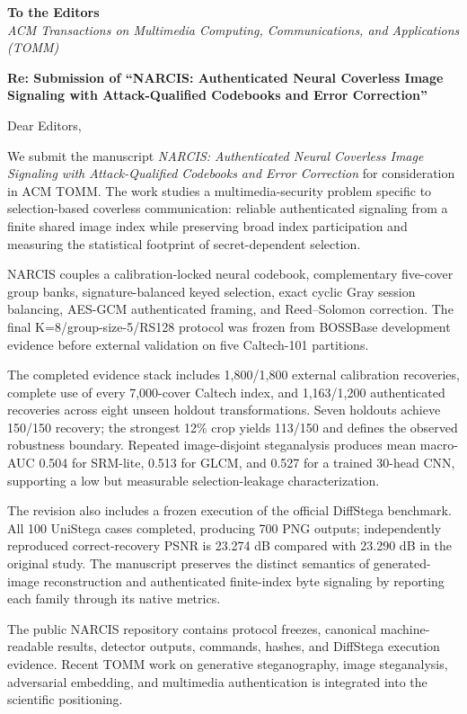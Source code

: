 \documentclass[11pt]{article}
\begin{document}
\thispagestyle{empty}

\textbf{To the Editors}\\
\textit{ACM Transactions on Multimedia Computing, Communications, and Applications (TOMM)}

\textbf{Re: Submission of ``NARCIS: Authenticated Neural Coverless Image Signaling with Attack-Qualified Codebooks and Error Correction''}

Dear Editors,

We submit the manuscript \emph{NARCIS: Authenticated Neural Coverless Image Signaling with Attack-Qualified Codebooks and Error Correction} for consideration in ACM TOMM. The work studies a multimedia-security problem specific to selection-based coverless communication: reliable authenticated signaling from a finite shared image index while preserving broad index participation and measuring the statistical footprint of secret-dependent selection.

NARCIS couples a calibration-locked neural codebook, complementary five-cover group banks, signature-balanced keyed selection, exact cyclic Gray session balancing, AES-GCM authenticated framing, and Reed--Solomon correction. The final K=8/group-size-5/RS128 protocol was frozen from BOSSBase development evidence before external validation on five Caltech-101 partitions.

The completed evidence stack includes 1,800/1,800 external calibration recoveries, complete use of every 7,000-cover Caltech index, and 1,163/1,200 authenticated recoveries across eight unseen holdout transformations. Seven holdouts achieve 150/150 recovery; the strongest 12\% crop yields 113/150 and defines the observed robustness boundary. Repeated image-disjoint steganalysis produces mean macro-AUC 0.504 for SRM-lite, 0.513 for GLCM, and 0.527 for a trained 30-head CNN, supporting a low but measurable selection-leakage characterization.

The revision also includes a frozen execution of the official DiffStega benchmark. All 100 UniStega cases completed, producing 700 PNG outputs; independently reproduced correct-recovery PSNR is 23.274 dB compared with 23.290 dB in the original study. The manuscript preserves the distinct semantics of generated-image reconstruction and authenticated finite-index byte signaling by reporting each family through its native metrics.

The public NARCIS repository contains protocol freezes, canonical machine-readable results, detector outputs, commands, hashes, and DiffStega execution evidence. Recent TOMM work on generative steganography, image steganalysis, adversarial embedding, and multimedia authentication is integrated into the scientific positioning.
\end{document}
